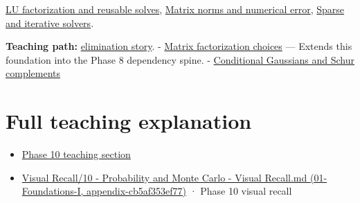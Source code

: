\hyperref[appendix-55e4b5b0a1e6]{LU factorization and reusable solves}, \hyperref[appendix-f8657bac66e5]{Matrix norms and numerical error}, \hyperref[appendix-67c87a3d9e94]{Sparse and iterative solvers}.

\textbf{Teaching path:} \href{Continuous\%20Notes/Computing\%20Foundations\%20-\%20From\%20Bits\%20to\%20C++\%20and\%20Systems\%20APIs\#Elimination\%20turns\%20the\%20geometry\%20into\%20an\%20auditable\%20calculation}{elimination story}. - \hyperref[appendix-221a483bec2d]{Matrix factorization choices} --- Extends this foundation into the Phase 8 dependency spine. - \hyperref[appendix-f0437ea55a47]{Conditional Gaussians and Schur complements}

\section{Full teaching explanation}\label{appendix-f6e77f4a200f-full-teaching-explanation}

\begin{itemize}
\tightlist
\item
  \href{Continuous\%20Notes/Computing\%20Foundations\%20-\%20From\%20Bits\%20to\%20C++\%20and\%20Systems\%20APIs\#5.\%20Waiting\%20times,\%20event\%20counts,\%20and\%20covariance\%20geometry}{Phase 10 teaching section}
\item
  \href{../01-Foundations-I/main.pdf\#nameddest=appendix-cb5af353ef77}{Visual Recall/10 - Probability and Monte Carlo - Visual Recall.md (01-Foundations-I, appendix-cb5af353ef77)} · Phase 10 visual recall
\end{itemize}

